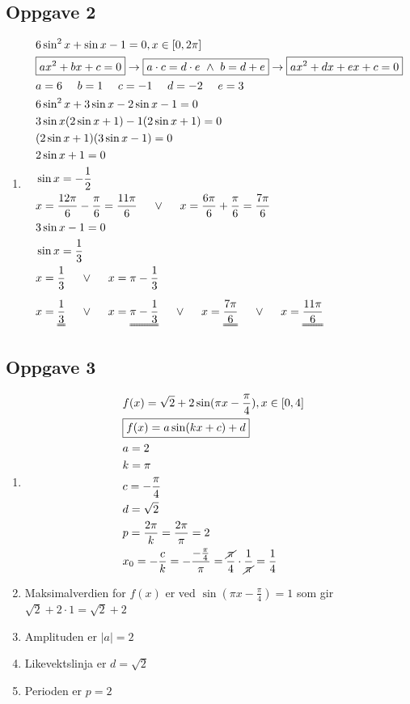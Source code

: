 \documentclass[11pt,a4paper]{report}
\newcommand{\opgd}[1]{\item[#1)]}
\newcommand{\opg}[1]{\subsection*{Oppgave #1}}
\begin{document}
\newpage
\opg{2}
\begin{enumerate}[leftmargin=*,itemsep=0.75cm,labelsep=1.5em,label=\alph*)]
\opgd{b}
\begin{align*}
&6 \sin^2 x + \sin x - 1 = 0, x \in [0, 2 \pi]\\
&\boxed{ax^2 + bx + c = 0} \rightarrow \boxed{a \cdot c = d \cdot e \ \land \ b = d + e} \rightarrow \boxed{ax^2 + dx + ex + c = 0}\\
&a = 6 \ \ \ \ b = 1 \ \ \ \ c = -1 \ \ \ \ d = -2 \ \ \ \ e = 3\\
&6 \sin^2 x + 3 \sin x - 2 \sin x - 1 = 0\\
&3 \sin x (2 \sin x + 1) - 1 (2 \sin x + 1) = 0\\
&(2 \sin x + 1) (3 \sin x - 1) = 0\\
&2 \sin x + 1 = 0\\
&\sin x = - \frac{1}{2}\\
&x = \frac{12 \pi}{6} - \frac{\pi}{6} = \frac{11 \pi}{6} \ \ \ \ \lor \ \ \ \ x = \frac{6 \pi}{6} + \frac{\pi}{6} = \frac{7 \pi}{6}\\
&3 \sin x - 1 = 0\\
&\sin x = \frac{1}{3}\\
&x = \frac{1}{3} \ \ \ \ \lor \ \ \ \ x = \pi - \frac{1}{3}\\[0.2cm]
&x = \uuline{\frac{1}{3}} \ \ \ \ \lor \ \ \ \ x = \uuline{\pi - \frac{1}{3}} \ \ \ \ \lor \ \ \ \ x = \uuline{\frac{7 \pi}{6}} \ \ \ \ \lor \ \ \ \ x = \uuline{\frac{11 \pi}{6}}
\end{align*}
\end{enumerate}


\newpage
\opg{3}
\begin{enumerate}[leftmargin=*,itemsep=0.75cm,labelsep=1.5em,label=\alph*)]
\item[]
\begin{align*}
&f(x) = \sqrt{2} + 2 \sin (\pi x - \frac{\pi}{4}), x \in [0, 4]&&\\
&\boxed{f(x) = a \sin (kx + c) + d}&&\\
&a = 2\\
&k = \pi\\
&c = - \frac{\pi}{4}\\
&d = \sqrt{2}\\
&p = \frac{2 \pi}{k} = \frac{2 \pi}{\pi} = 2&&\\
&x_0 = - \frac{c}{k} = - \frac{-\frac{\pi}{4}}{\pi} = \frac{\cancel{\pi}}{4} \cdot \frac{1}{\cancel{\pi}} = \frac{1}{4}
\end{align*}
\opgd{a}
Maksimalverdien for $f(x)$ er ved $\sin(\pi x - \frac{\pi}{4}) = 1$ som gir $\sqrt{2} + 2 \cdot 1 = \sqrt{2} + 2$\\
\opgd{b}
Amplituden er $|a| = 2$\\
\opgd{c}
Likevektslinja er $d = \sqrt{2}$\\
\opgd{d}
Perioden er $p = 2$\\
\end{enumerate}
\end{document}
